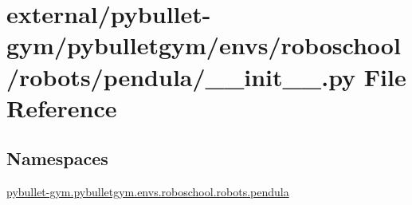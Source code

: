 \hypertarget{external_2pybullet-gym_2pybulletgym_2envs_2roboschool_2robots_2pendula_2____init_____8py}{}\section{external/pybullet-\/gym/pybulletgym/envs/roboschool/robots/pendula/\+\_\+\+\_\+init\+\_\+\+\_\+.py File Reference}
\label{external_2pybullet-gym_2pybulletgym_2envs_2roboschool_2robots_2pendula_2____init_____8py}
\subsection*{Namespaces}
\begin{DoxyCompactItemize}
\item 
 \hyperlink{namespacepybullet-gym_1_1pybulletgym_1_1envs_1_1roboschool_1_1robots_1_1pendula}{pybullet-\/gym.\+pybulletgym.\+envs.\+roboschool.\+robots.\+pendula}
\end{DoxyCompactItemize}
